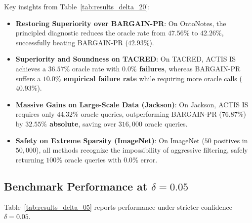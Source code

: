 \documentclass[11pt,a4paper]{article}
\begin{document}
Key insights from Table~\ref{tab:results_delta_20}:
\begin{itemize}[leftmargin=*]
    \item \textbf{Restoring Superiority over BARGAIN-PR}: On OntoNotes, the principled diagnostic reduces the oracle rate from $47.56\%$ to $42.26\%$, successfully beating BARGAIN-PR ($42.93\%$).
    \item \textbf{Superiority and Soundness on TACRED}: On TACRED, ACTIS IS achieves a $36.57\%$ oracle rate with \textbf{$0.0\%$ failures}, whereas BARGAIN-PR suffers a \textbf{$10.0\%$ empirical failure rate} while requiring more oracle calls ($40.93\%$).
    \item \textbf{Massive Gains on Large-Scale Data (Jackson)}: On Jackson, ACTIS IS requires only $44.32\%$ oracle queries, outperforming BARGAIN-PR ($76.87\%$) by \textbf{$32.55\%$ absolute}, saving over $316,000$ oracle queries.
    \item \textbf{Safety on Extreme Sparsity (ImageNet)}: On ImageNet ($50$ positives in $50,000$), all methods recognize the impossibility of aggressive filtering, safely returning $100\%$ oracle queries with $0.0\%$ error.
\end{itemize}

\subsection{Benchmark Performance at $\delta = 0.05$}
Table~\ref{tab:results_delta_05} reports performance under stricter confidence $\delta = 0.05$.
\end{document}
